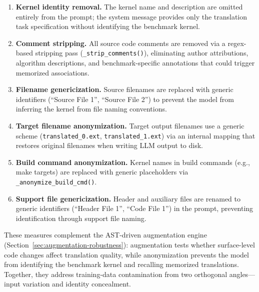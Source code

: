 \documentclass{article}
\begin{document}
\begin{enumerate}
  \item \textbf{Kernel identity removal.} The kernel name and description are omitted entirely from the prompt; the system message provides only the translation task specification without identifying the benchmark kernel. %
  \item \textbf{Comment stripping.} All source code comments are removed via a regex-based stripping pass (\texttt{\_strip\_comments()}), eliminating author attributions, algorithm descriptions, and benchmark-specific annotations that could trigger memorized associations. %
  \item \textbf{Filename genericization.} Source filenames are replaced with generic identifiers (``Source File 1'', ``Source File 2'') to prevent the model from inferring the kernel from file naming conventions. %
  \item \textbf{Target filename anonymization.} Target output filenames use a generic scheme (\texttt{translated\_0.ext}, \texttt{translated\_1.ext}) via an internal mapping that restores original filenames when writing LLM output to disk. %
  \item \textbf{Build command anonymization.} Kernel names in build commands (e.g., make targets) are replaced with generic placeholders via \texttt{\_anonymize\_build\_cmd()}. %
  \item \textbf{Support file genericization.} Header and auxiliary files are renamed to generic identifiers (``Header File 1'', ``Code File 1'') in the prompt, preventing identification through support file naming. %
\end{enumerate}

These measures complement the AST-driven augmentation engine (Section~\ref{sec:augmentation-robustness}): augmentation tests whether surface-level code changes affect translation quality, while anonymization prevents the model from identifying the benchmark kernel and recalling memorized translations. Together, they address training-data contamination from two orthogonal angles---input variation and identity concealment.
\end{document}

